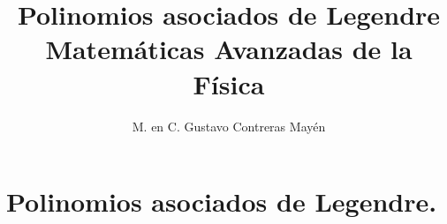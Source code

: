 
\title{Polinomios asociados de Legendre \\[0.3em]  \large{Matemáticas Avanzadas de la Física}\vspace{-3ex}}
\author{M. en C. Gustavo Contreras Mayén}

\vspace{-4cm}
\maketitle
\fontsize{14}{14}\selectfont

\section{Polinomios asociados de Legendre.}

